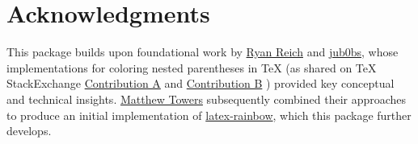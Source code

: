 \documentclass[10pt, a4paper]{article}
\begin{document}
	\section{Acknowledgments}\label{sec:acknowledgments}
	This package builds upon foundational work by \href{https://tex.stackexchange.com/users/575/ryan-reich}{Ryan Reich} and \href{https://tex.stackexchange.com/users/21891/jub0bs}{jub0bs}, whose implementations for coloring nested parentheses in TeX (as shared on TeX StackExchange \href{https://tex.stackexchange.com/questions/88682/indicating-matching-brackets-parentheses-in-tex-output }{Contribution A}  and \href{https://tex.stackexchange.com/questions/235740/how-can-i-color-parentheses-depending-on-the-nesting-level-like-emacs-rainbow}{Contribution B} ) provided key conceptual and technical insights. \href{https://github.com/matthew-towers}{Matthew Towers} subsequently combined their approaches to produce an initial implementation of \href{https://github.com/matthew-towers/latex-rainbow}{latex-rainbow}, which this package further develops.
\end{document}
